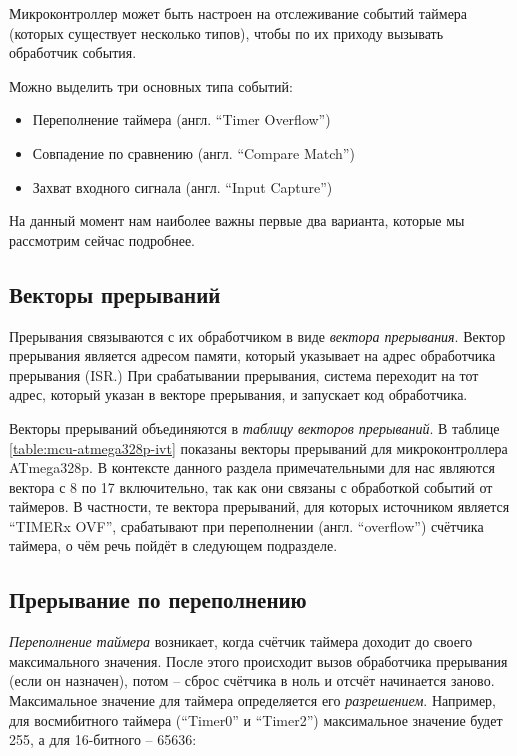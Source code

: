 \documentclass[../sparc.tex]{subfiles}
\begin{document}
Микроконтроллер может быть настроен на отслеживание событий таймера (которых
существует несколько типов), чтобы по их приходу вызывать обработчик события.

Можно выделить три основных типа событий:
\begin{itemize}
\item Переполнение таймера (англ. ``Timer Overflow'')
\item Совпадение по сравнению (англ. ``Compare Match'')
\item Захват входного сигнала (англ. ``Input Capture'')
\end{itemize}

На данный момент нам наиболее важны первые два варианта, которые мы рассмотрим
сейчас подробнее.

\newpage
\subsection{Векторы прерываний}
\label{subsection:mcu-ivt}

Прерывания связываются с их обработчиком в виде \emph{вектора прерывания}.
Вектор прерывания является адресом памяти, который указывает на адрес
обработчика прерывания (\gls{ISR}.)  При срабатывании прерывания, система
переходит на тот адрес, который указан в векторе прерывания, и запускает код
обработчика.


Векторы прерываний объединяются в \emph{таблицу векторов прерываний}.  В таблице
\ref{table:mcu-atmega328p-ivt} показаны векторы
прерываний\cite[49]{avr:atmega328p-datasheet} для микроконтроллера ATmega328p.
В контексте данного раздела примечательными для нас являются вектора с 8 по 17
включительно, так как они связаны с обработкой событий от таймеров.  В
частности, те вектора прерываний, для которых источником является ``TIMERx
OVF'', срабатывают при переполнении (англ. ``overflow'') счётчика таймера, о чём
речь пойдёт в следующем подразделе.

\subsection{Прерывание по переполнению}


\emph{Переполнение таймера} возникает, когда счётчик таймера доходит до своего
максимального значения.  После этого происходит вызов обработчика прерывания
(если он назначен), потом -- сброс счётчика в ноль и отсчёт начинается заново.
Максимальное значение для таймера определяется его \emph{разрешением}.
Например, для восмибитного таймера (``Timer0'' и ``Timer2'') максимальное
значение будет 255, а для 16-битного -- 65636:
\end{document}
